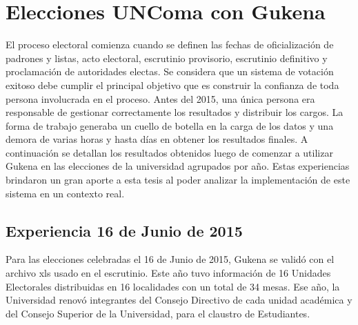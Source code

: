 \chapter{Elecciones UNComa con Gukena}
\label{Gukena2}
El proceso electoral comienza cuando se definen las fechas de oficialización de padrones y listas, acto electoral, escrutinio provisorio, escrutinio definitivo y proclamación de autoridades electas. Se considera que un sistema de votación exitoso debe cumplir el principal objetivo que es construir la confianza de toda persona involucrada en el proceso. 
Antes del 2015, una única persona era responsable de gestionar correctamente los resultados y distribuir los cargos. La forma de trabajo generaba un cuello de botella en la carga de los datos y una demora de varias horas y hasta días en obtener los resultados finales. \newline
A continuación se detallan los resultados obtenidos luego de comenzar a utilizar Gukena en las elecciones de la universidad agrupados por año. Estas experiencias brindaron un gran aporte a esta tesis al poder analizar la implementación de este sistema en un contexto real.

\section{Experiencia 16 de Junio de 2015}
Para las elecciones celebradas el 16 de Junio de 2015, Gukena se validó con el archivo xls usado en el escrutinio. Este año tuvo información de 16 Unidades Electorales distribuidas en 16 localidades con un total de 34 mesas. 
Ese año, la Universidad renovó integrantes del Consejo Directivo de cada unidad académica y del Consejo Superior de la Universidad, para el claustro de Estudiantes.

